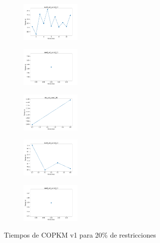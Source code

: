 \begin{figure}[H]
\begin{subfigure}
    \end{subfigure}
    \hfill
    \begin{subfigure}
        \centering
        \includegraphics[width=0.32\textwidth]{img/copkm/ecoli_set_const_20_49258669_time.png}
    \end{subfigure}
    \hfill
    \begin{subfigure}
        \centering
        \includegraphics[width=0.32\textwidth]{img/copkm/rand_set_const_20_49258669_time.png}
    \end{subfigure}
    \hfill
    \begin{subfigure}
        \centering
        \includegraphics[width=0.32\textwidth]{img/copkm/iris_set_const_20_3773969821_time.png}
    \end{subfigure}
    \hfill
    \begin{subfigure}
        \centering
        \includegraphics[width=0.32\textwidth]{img/copkm/ecoli_set_const_20_3773969821_time.png}
    \end{subfigure}
    \hfill
    \begin{subfigure}
        \centering
        \includegraphics[width=0.32\textwidth]{img/copkm/rand_set_const_20_3773969821_time.png}
    \end{subfigure}
    \caption{Tiempos de COPKM v1 para 20\% de restricciones}
\end{figure}

